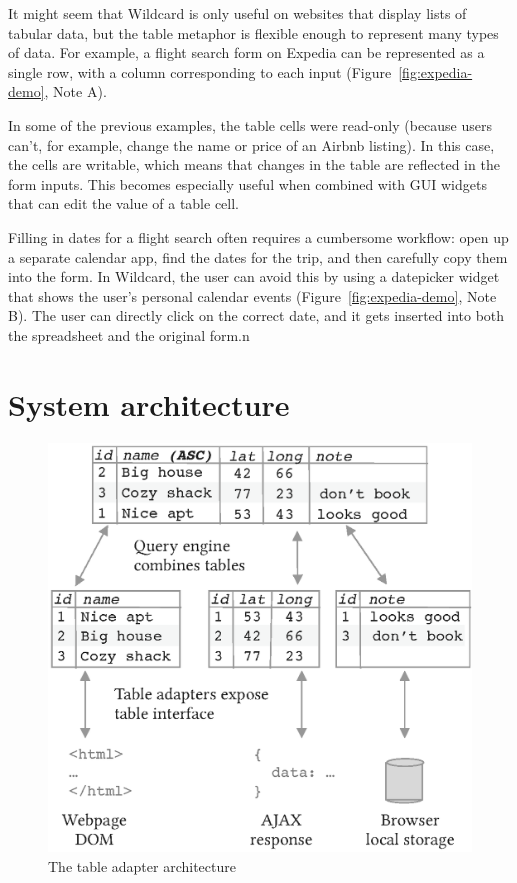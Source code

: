 \documentclass[sigplan,10pt,anonymous,review]{acmart}
\begin{document}
It might seem that Wildcard is only useful on websites that display
lists of tabular data, but the table metaphor is flexible enough to
represent many types of data. For example, a flight search form on
Expedia can be represented as a single row, with a column corresponding
to each input{ (Figure~\ref{fig:expedia-demo}, Note A)}.

In some of the previous examples, the table cells were read-only
(because users can't, for example, change the name or price of an Airbnb
listing). In this case, the cells are writable, which means that changes
in the table are reflected in the form inputs. This becomes especially
useful when combined with GUI widgets that can edit the value of a table
cell.

Filling in dates for a flight search often requires a cumbersome
workflow: open up a separate calendar app, find the dates for the trip,
and then carefully copy them into the form. In Wildcard, the user can
avoid this by using a datepicker widget that shows the user's personal
calendar events{ (Figure~\ref{fig:expedia-demo}, Note B)}. The user can
directly click on the correct date, and it gets inserted into both the
spreadsheet and the original form.n

\hypertarget{sec:architecture}{%
\section{System architecture}\label{sec:architecture}}

\begin{figure}
\hypertarget{fig:table-adapter}{%
\centering
\includegraphics[width=\columnwidth]{media/table-adapter.eps}
\caption{The table adapter architecture}\label{fig:table-adapter}
}
\end{figure}
\end{document}
